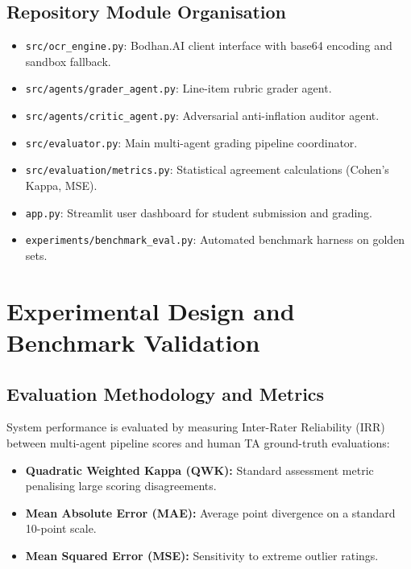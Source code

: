 \documentclass[11pt,a4paper]{article}
\begin{document}
\subsection{Repository Module Organisation}
\begin{itemize}
    \item \texttt{src/ocr\_engine.py}: Bodhan.AI client interface with base64 encoding and sandbox fallback.
    \item \texttt{src/agents/grader\_agent.py}: Line-item rubric grader agent.
    \item \texttt{src/agents/critic\_agent.py}: Adversarial anti-inflation auditor agent.
    \item \texttt{src/evaluator.py}: Main multi-agent grading pipeline coordinator.
    \item \texttt{src/evaluation/metrics.py}: Statistical agreement calculations (Cohen's Kappa, MSE).
    \item \texttt{app.py}: Streamlit user dashboard for student submission and grading.
    \item \texttt{experiments/benchmark\_eval.py}: Automated benchmark harness on golden sets.
\end{itemize}

\newpage
\section{Experimental Design and Benchmark Validation}

\subsection{Evaluation Methodology and Metrics}
System performance is evaluated by measuring Inter-Rater Reliability (IRR) between multi-agent pipeline scores and human TA ground-truth evaluations:
\begin{itemize}
    \item \textbf{Quadratic Weighted Kappa (QWK):} Standard assessment metric penalising large scoring disagreements.
    \item \textbf{Mean Absolute Error (MAE):} Average point divergence on a standard 10-point scale.
    \item \textbf{Mean Squared Error (MSE):} Sensitivity to extreme outlier ratings.
\end{itemize}
\end{document}

